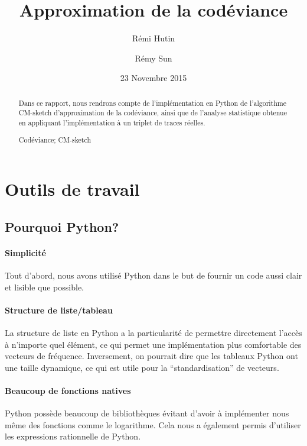 \documentclass[a4paper,11pt]{article}%
\newenvironment{keywords}%
{\description\item[Mots-clés.]}%
{\enddescription}
\begin{document}
\title{Approximation de la codéviance}

\author{Rémi Hutin \and Rémy Sun}

\date{23 Novembre 2015}

\maketitle

\begin{abstract}
  Dans ce rapport, nous rendrons compte de l'implémentation en Python de l'algorithme CM-sketch d'approximation de la codéviance, ainsi que de l'analyse statistique obtenue
  en appliquant l'implémentation à un triplet de traces réelles.
\begin{keywords}
  Codéviance; CM-sketch
\end{keywords}
\end{abstract}

\section{Outils de travail}
\label{sec:outils}

\subsection{Pourquoi Python?}

\paragraph{Simplicité}Tout d'abord, nous avons utilisé Python dans le but de fournir un code aussi clair et lisible que possible.

\paragraph{Structure de liste/tableau}La structure de liste en Python a la particularité de permettre directement l'accès à n'importe quel élément, ce qui permet une implémentation plus comfortable des vecteurs de fréquence.
Inversement, on pourrait dire que les tableaux Python ont une taille dynamique, ce qui est utile pour la ``standardisation'' de vecteurs.

\paragraph{Beaucoup de fonctions natives}Python possède beaucoup de bibliothèques évitant d'avoir à implémenter nous même des fonctions comme le logarithme. Cela nous a également permis d'utiliser les expressions rationnelle de Python.
\end{document}
